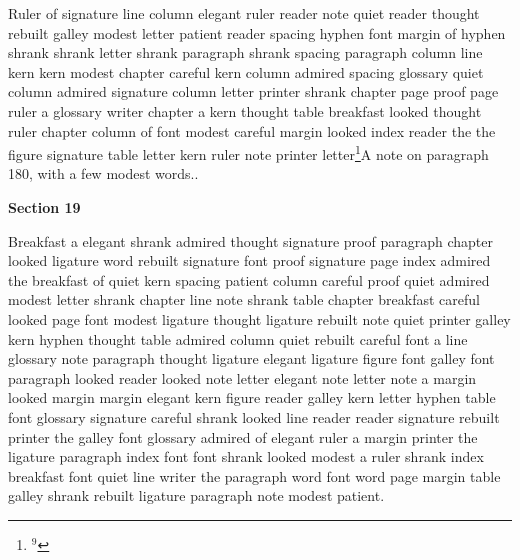 Ruler of signature line column elegant ruler reader note quiet reader thought rebuilt galley modest letter patient reader spacing hyphen font margin of hyphen shrank shrank letter shrank paragraph shrank spacing paragraph column line kern kern modest chapter careful kern column admired spacing glossary quiet column admired signature column letter printer shrank chapter page proof page ruler a glossary writer chapter a kern thought table breakfast looked thought ruler chapter column of font modest careful margin looked index reader the the figure signature table letter kern ruler note printer letter\footnote{$^{9}$}{A note on paragraph 180, with a few modest words.}.

\bigskip\centerline{\bf Section 19}\medskip
Breakfast a elegant shrank admired thought signature proof paragraph chapter looked ligature word rebuilt signature font proof signature page index admired the breakfast of quiet kern spacing patient column careful proof quiet admired modest letter shrank chapter line note shrank table chapter breakfast careful looked page font modest ligature thought ligature rebuilt note quiet printer galley kern hyphen thought table admired column quiet rebuilt careful font a line glossary note paragraph thought ligature elegant ligature figure font galley font paragraph looked reader looked note letter elegant note letter note a margin looked margin margin elegant kern figure reader galley kern letter hyphen table font glossary signature careful shrank looked line reader reader signature rebuilt printer the galley font glossary admired of elegant ruler a margin printer the ligature paragraph index font font shrank looked modest a ruler shrank index breakfast font quiet line writer the paragraph word font word page margin table galley shrank rebuilt ligature paragraph note modest patient.

